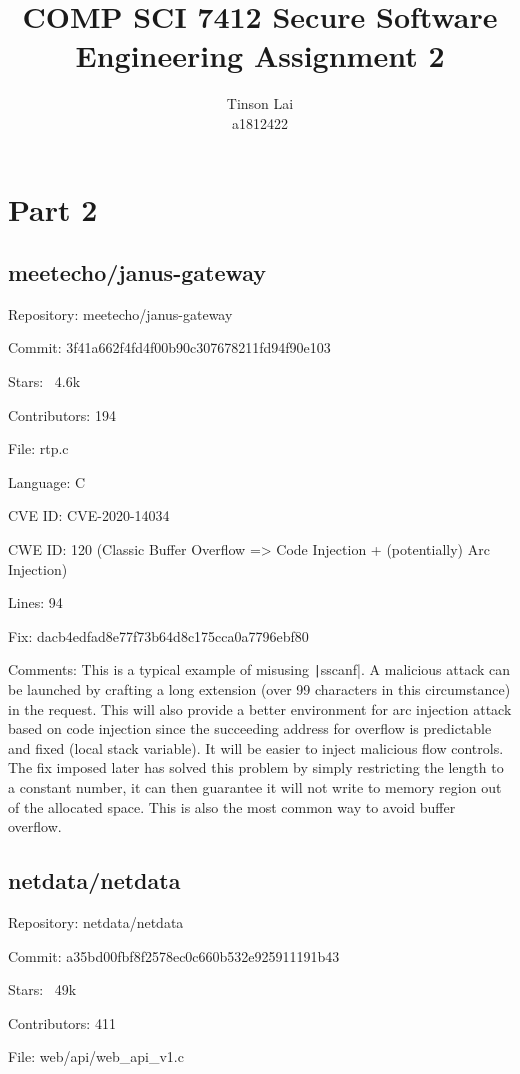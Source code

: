 \documentclass[12pt]{article}
\title{COMP SCI 7412 Secure Software Engineering Assignment 2}
\author{Tinson Lai \\ a1812422}
\date{}
\begin{document}
\maketitle

\section{Part 2}

\subsection{meetecho/janus-gateway}

Repository: meetecho/janus-gateway

Commit: 3f41a662f4fd4f00b90c307678211fd94f90e103

Stars: ~4.6k

Contributors: 194

File: rtp.c

Language: C

CVE ID: CVE-2020-14034

CWE ID: 120 (Classic Buffer Overflow => Code Injection + (potentially) Arc Injection)

Lines: 94

Fix: dacb4edfad8e77f73b64d8c175cca0a7796ebf80

Comments: This is a typical example of misusing \texttt|sscanf|. A malicious attack can be launched by crafting a long extension (over 99 characters in this circumstance) in the request. This will also provide a better environment for arc injection attack based on code injection since the succeeding address for overflow is predictable and fixed (local stack variable). It will be easier to inject malicious flow controls. The fix imposed later has solved this problem by simply restricting the length to a constant number, it can then guarantee it will not write to memory region out of the allocated space. This is also the most common way to avoid buffer overflow.

\subsection{netdata/netdata}

Repository: netdata/netdata

Commit: a35bd00fbf8f2578ec0c660b532e925911191b43

Stars: ~49k

Contributors: 411

File: web/api/web\_api\_v1.c
\end{document}

